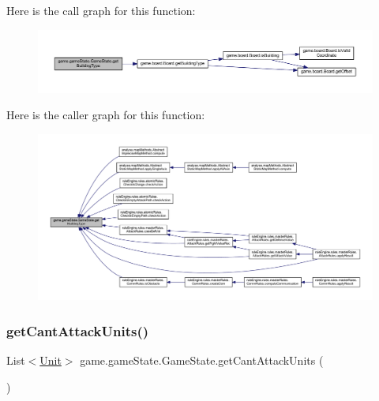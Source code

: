 Here is the call graph for this function\+:
\nopagebreak
\begin{figure}[H]
\begin{center}
\leavevmode
\includegraphics[width=350pt]{classgame_1_1game_state_1_1_game_state_a2d95887f3ee78109ddcb0b27b6a8ec93_cgraph}
\end{center}
\end{figure}
Here is the caller graph for this function\+:
\nopagebreak
\begin{figure}[H]
\begin{center}
\leavevmode
\includegraphics[width=350pt]{classgame_1_1game_state_1_1_game_state_a2d95887f3ee78109ddcb0b27b6a8ec93_icgraph}
\end{center}
\end{figure}
\mbox{\label{classgame_1_1game_state_1_1_game_state_a79fab4d746df83e6391ecb9db1c3ff09}} 
\subsubsection{\texorpdfstring{get\+Cant\+Attack\+Units()}{getCantAttackUnits()}}
{\footnotesize\ttfamily List$<$\mbox{\hyperlink{classgame_1_1board_1_1_unit}{Unit}}$>$ game.\+game\+State.\+Game\+State.\+get\+Cant\+Attack\+Units (\begin{DoxyParamCaption}{ }\end{DoxyParamCaption})\hspace{0.3cm}{\ttfamily [inline]}}

